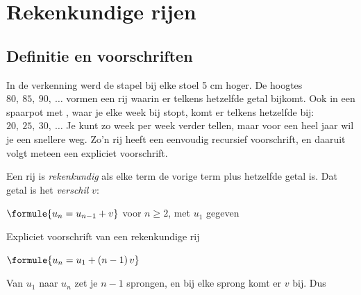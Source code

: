 \begin{oefeningen}[Start]

\end{oefeningen}


\section{Rekenkundige rijen}

\subsection{Definitie en voorschriften}

In de verkenning werd de stapel bij elke stoel 5 cm hoger. De hoogtes $80,\ 85,\ 90,\ \ldots$ vormen een rij waarin er telkens hetzelfde getal bijkomt. Ook in een spaarpot met , waar je elke week  bij stopt, komt er telkens hetzelfde bij: $20,\ 25,\ 30,\ \ldots$ Je kunt zo week per week verder tellen, maar voor een heel jaar wil je een snellere weg. Zo'n rij heeft een eenvoudig recursief voorschrift, en daaruit volgt meteen een expliciet voorschrift.

\begin{theorie}
Een rij is \emph{rekenkundig} als elke term de vorige term plus hetzelfde getal is. Dat getal is het \emph{verschil} $v$:

\qquad $\formule{u_n = u_{n-1} + v}$ \quad voor $n \geqslant 2$, met $u_1$ gegeven

\begin{stelling}{Expliciet voorschrift van een rekenkundige rij}
\begin{minipage}[t]{.4\linewidth}
\vspace{0pt}
\qquad $\formule{u_n = u_1 + (n-1)\,v}$
\end{minipage}\hfill
\begin{minipage}[t]{.56\linewidth}
\vspace{0pt}
\end{minipage}
\end{stelling}

\begin{bewijs}
Van $u_1$ naar $u_n$ zet je $n - 1$ sprongen, en bij elke sprong komt er $v$ bij. Dus
\end{bewijs}
\end{theorie}

